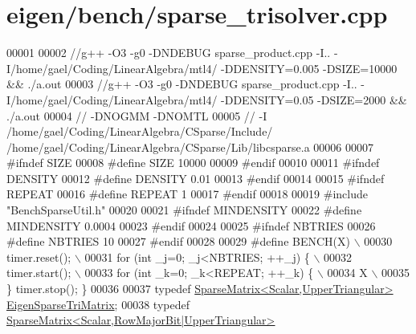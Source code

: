 \hypertarget{eigen_2bench_2sparse__trisolver_8cpp_source}{}\section{eigen/bench/sparse\+\_\+trisolver.cpp}
\label{eigen_2bench_2sparse__trisolver_8cpp_source}

\begin{DoxyCode}
00001 
00002 \textcolor{comment}{//g++ -O3 -g0 -DNDEBUG  sparse\_product.cpp -I.. -I/home/gael/Coding/LinearAlgebra/mtl4/ -DDENSITY=0.005
       -DSIZE=10000 && ./a.out}
00003 \textcolor{comment}{//g++ -O3 -g0 -DNDEBUG  sparse\_product.cpp -I.. -I/home/gael/Coding/LinearAlgebra/mtl4/ -DDENSITY=0.05
       -DSIZE=2000 && ./a.out}
00004 \textcolor{comment}{// -DNOGMM -DNOMTL}
00005 \textcolor{comment}{// -I /home/gael/Coding/LinearAlgebra/CSparse/Include/
       /home/gael/Coding/LinearAlgebra/CSparse/Lib/libcsparse.a}
00006 
00007 \textcolor{preprocessor}{#ifndef SIZE}
00008 \textcolor{preprocessor}{#define SIZE 10000}
00009 \textcolor{preprocessor}{#endif}
00010 
00011 \textcolor{preprocessor}{#ifndef DENSITY}
00012 \textcolor{preprocessor}{#define DENSITY 0.01}
00013 \textcolor{preprocessor}{#endif}
00014 
00015 \textcolor{preprocessor}{#ifndef REPEAT}
00016 \textcolor{preprocessor}{#define REPEAT 1}
00017 \textcolor{preprocessor}{#endif}
00018 
00019 \textcolor{preprocessor}{#include "BenchSparseUtil.h"}
00020 
00021 \textcolor{preprocessor}{#ifndef MINDENSITY}
00022 \textcolor{preprocessor}{#define MINDENSITY 0.0004}
00023 \textcolor{preprocessor}{#endif}
00024 
00025 \textcolor{preprocessor}{#ifndef NBTRIES}
00026 \textcolor{preprocessor}{#define NBTRIES 10}
00027 \textcolor{preprocessor}{#endif}
00028 
00029 \textcolor{preprocessor}{#define BENCH(X) \(\backslash\)}
00030 \textcolor{preprocessor}{  timer.reset(); \(\backslash\)}
00031 \textcolor{preprocessor}{  for (int \_j=0; \_j<NBTRIES; ++\_j) \{ \(\backslash\)}
00032 \textcolor{preprocessor}{    timer.start(); \(\backslash\)}
00033 \textcolor{preprocessor}{    for (int \_k=0; \_k<REPEAT; ++\_k) \{ \(\backslash\)}
00034 \textcolor{preprocessor}{        X  \(\backslash\)}
00035 \textcolor{preprocessor}{  \} timer.stop(); \}}
00036 
00037 \textcolor{keyword}{typedef} \hyperlink{group___sparse_core___module_class_eigen_1_1_sparse_matrix}{SparseMatrix<Scalar,UpperTriangular>} 
      \hyperlink{group___sparse_core___module_class_eigen_1_1_sparse_matrix}{EigenSparseTriMatrix};
00038 \textcolor{keyword}{typedef} \hyperlink{group___sparse_core___module_class_eigen_1_1_sparse_matrix}{SparseMatrix<Scalar,RowMajorBit|UpperTriangular>} 

\end{DoxyCode}
